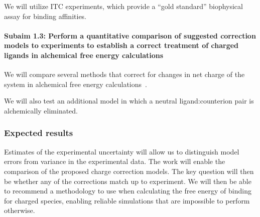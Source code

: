\documentclass[10pt,final]{article}
\newcommand{\subsubsubsection}[1]{\paragraph*{#1}}
\begin{document}
We will utilize ITC experiments, which provide a “gold standard” biophysical assay for binding affinities.






\subsubsubsection{Subaim 1.3: Perform a quantitative comparison of suggested correction models to experiments to establish a correct treatment of charged ligands in alchemical free energy calculations}
We will compare several methods that correct for changes in net charge of the system in alchemical free energy calculations~\cite{Reif2013a,Rocklin2013a}. %


We will also test an additional model in which a neutral ligand:counterion pair is alchemically eliminated. %

\subsubsection*{Expected results}
Estimates of the experimental uncertainty will allow us to distinguish model errors from variance in the experimental data.
The work will enable the comparison of the proposed charge correction models. %
The key question will then be whether any of the corrections  match up to experiment.
We will then be able to recommend a methodology to use when calculating the free energy of binding for charged species, enabling reliable simulations that are impossible to perform otherwise.
\end{document}
